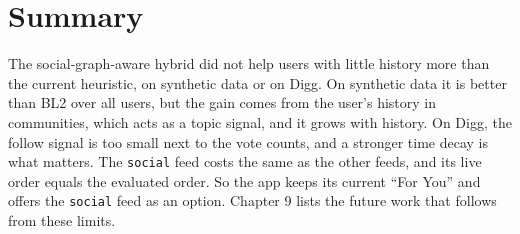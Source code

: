 \section{Summary}
\label{sec:disc-summary}

The social-graph-aware hybrid did not help users with little history more than the current heuristic, on synthetic data or on Digg. On synthetic data it is better than BL2 over all users, but the gain comes from the user's history in communities, which acts as a topic signal, and it grows with history. On Digg, the follow signal is too small next to the vote counts, and a stronger time decay is what matters. The \texttt{social} feed costs the same as the other feeds, and its live order equals the evaluated order. So the app keeps its current ``For You'' and offers the \texttt{social} feed as an option. Chapter 9 lists the future work that follows from these limits.
